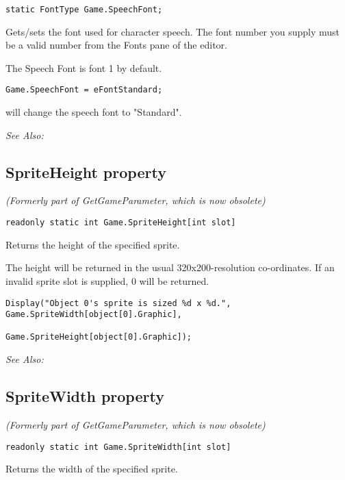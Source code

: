 \begin{verbatim}
static FontType Game.SpeechFont;
\end{verbatim}
Gets/sets the font used for character speech. The font number you
supply must be a valid number from the Fonts pane of the editor.

The Speech Font is font 1 by default.

\begin{verbatim}
Game.SpeechFont = eFontStandard;
\end{verbatim}
will change the speech font to "Standard".

\it{See Also:} 


\subsection{SpriteHeight property}\label{Game.SpriteHeight}%

\it{(Formerly part of GetGameParameter, which is now obsolete)}

\begin{verbatim}
readonly static int Game.SpriteHeight[int slot]
\end{verbatim}
Returns the height of the specified sprite.

The height will be returned in the usual 320x200-resolution co-ordinates. If an invalid
sprite slot is supplied, 0 will be returned.

\begin{verbatim}
Display("Object 0's sprite is sized %d x %d.", Game.SpriteWidth[object[0].Graphic],
                                               Game.SpriteHeight[object[0].Graphic]);
\end{verbatim}

\it{See Also:} 


\subsection{SpriteWidth property}\label{Game.SpriteWidth}%

\it{(Formerly part of GetGameParameter, which is now obsolete)}

\begin{verbatim}
readonly static int Game.SpriteWidth[int slot]
\end{verbatim}
Returns the width of the specified sprite.

